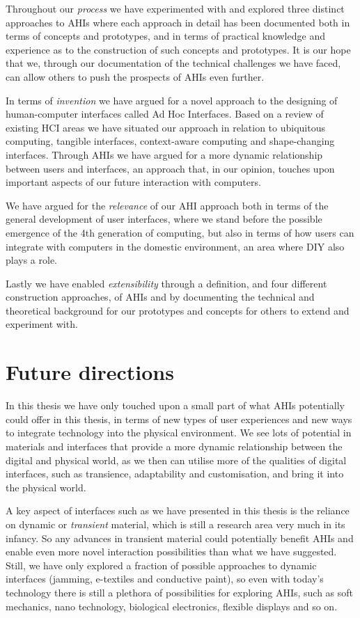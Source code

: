 Throughout our \emph{process} we have experimented with and explored three distinct approaches to AHIs where each approach in detail has been documented both in terms of concepts and prototypes, and in terms of practical knowledge and experience as to the construction of such concepts and prototypes.
It is our hope that we, through our documentation of the technical challenges we have faced, can allow others to push the prospects of AHIs even further.

In terms of \emph{invention} we have argued for a novel approach to the designing of human-computer interfaces called Ad Hoc Interfaces.
Based on a review of existing HCI areas we have situated our approach in relation to ubiquitous computing, tangible interfaces, context-aware computing and shape-changing interfaces.
Through AHIs we have argued for a more dynamic relationship between users and interfaces, an approach that, in our opinion, touches upon important aspects of our future interaction with computers.

We have argued for the \emph{relevance} of our AHI approach both in terms of the general development of user interfaces, where we stand before the possible emergence of the 4th generation of computing, but also in terms of how users can integrate with computers in the domestic environment, an area where DIY also plays a role.

Lastly we have enabled \emph{extensibility} through a definition, and four different construction approaches, of AHIs and by documenting the technical and theoretical background for our prototypes and concepts for others to extend and experiment with.

\section{Future directions}
In this thesis we have only touched upon a small part of what AHIs potentially could offer in this thesis, in terms of new types of user experiences and new ways to integrate technology into the physical environment.
We see lots of potential in materials and interfaces that provide a more dynamic relationship between the digital and physical world, as we then can utilise more of the qualities of digital interfaces, such as transience, adaptability and customisation, and bring it into the physical world.

A key aspect of interfaces such as we have presented in this thesis is the reliance on dynamic or \emph{transient} material, which is still a research area very much in its infancy.
So any advances in transient material could potentially benefit AHIs and enable even more novel interaction possibilities than what we have suggested.
Still, we have only explored a fraction of possible approaches to dynamic interfaces (jamming, e-textiles and conductive paint), so even with today's technology there is still a plethora of possibilities for exploring AHIs, such as soft mechanics, nano technology, biological electronics, flexible displays and so on.

\begin{verbatim}

\end{verbatim}
